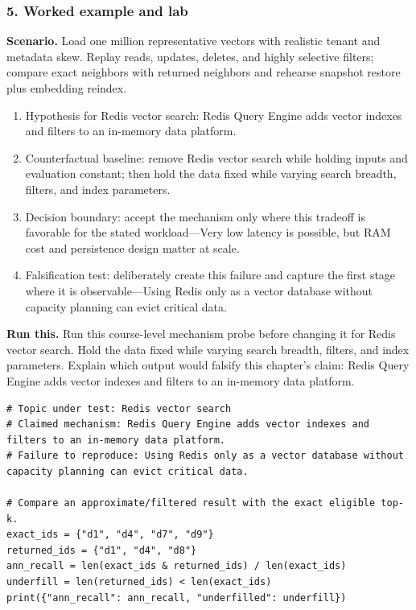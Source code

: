\subsubsection*{5. Worked example and lab}
\textbf{Scenario.} Load one million representative vectors with realistic tenant and metadata skew. Replay reads, updates, deletes, and highly selective filters; compare exact neighbors with returned neighbors and rehearse snapshot restore plus embedding reindex.
\begin{enumerate}
\item Hypothesis for Redis vector search: Redis Query Engine adds vector indexes and filters to an in-memory data platform.
\item Counterfactual baseline: remove Redis vector search while holding inputs and evaluation constant; then hold the data fixed while varying search breadth, filters, and index parameters.
\item Decision boundary: accept the mechanism only where this tradeoff is favorable for the stated workload—Very low latency is possible, but RAM cost and persistence design matter at scale.
\item Falsification test: deliberately create this failure and capture the first stage where it is observable—Using Redis only as a vector database without capacity planning can evict critical data.
\end{enumerate}
\textbf{Run this.} Run this course-level mechanism probe before changing it for Redis vector search. Hold the data fixed while varying search breadth, filters, and index parameters. Explain which output would falsify this chapter's claim: Redis Query Engine adds vector indexes and filters to an in-memory data platform.
\begin{Verbatim}[fontsize=\scriptsize]
# Topic under test: Redis vector search
# Claimed mechanism: Redis Query Engine adds vector indexes and filters to an in-memory data platform.
# Failure to reproduce: Using Redis only as a vector database without capacity planning can evict critical data.

# Compare an approximate/filtered result with the exact eligible top-k.
exact_ids = {"d1", "d4", "d7", "d9"}
returned_ids = {"d1", "d4", "d8"}
ann_recall = len(exact_ids & returned_ids) / len(exact_ids)
underfill = len(returned_ids) < len(exact_ids)
print({"ann_recall": ann_recall, "underfilled": underfill})
\end{Verbatim}
